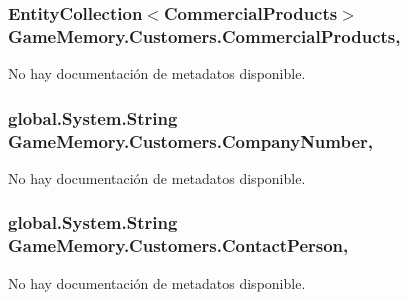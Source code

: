 \hypertarget{class_game_memory_1_1_customers_af6e416e7fd1236586fab8e29ba132445}{
\subsubsection[{Commercial\-Products}]{\setlength{\rightskip}{0pt plus 5cm}Entity\-Collection$<${\bf Commercial\-Products}$>$ Game\-Memory.\-Customers.\-Commercial\-Products\hspace{0.3cm}{\ttfamily [get]}, {\ttfamily [set]}}}\label{class_game_memory_1_1_customers_af6e416e7fd1236586fab8e29ba132445}


No hay documentación de metadatos disponible. 

\hypertarget{class_game_memory_1_1_customers_a62e5b08d21d78953b35d3b2fefd833ba}{
\subsubsection[{Company\-Number}]{\setlength{\rightskip}{0pt plus 5cm}global.\-System.\-String Game\-Memory.\-Customers.\-Company\-Number\hspace{0.3cm}{\ttfamily [get]}, {\ttfamily [set]}}}\label{class_game_memory_1_1_customers_a62e5b08d21d78953b35d3b2fefd833ba}


No hay documentación de metadatos disponible. 

\hypertarget{class_game_memory_1_1_customers_a3d4d2e80ca8d609a215f4cfe037ccfc0}{
\subsubsection[{Contact\-Person}]{\setlength{\rightskip}{0pt plus 5cm}global.\-System.\-String Game\-Memory.\-Customers.\-Contact\-Person\hspace{0.3cm}{\ttfamily [get]}, {\ttfamily [set]}}}\label{class_game_memory_1_1_customers_a3d4d2e80ca8d609a215f4cfe037ccfc0}


No hay documentación de metadatos disponible. 

